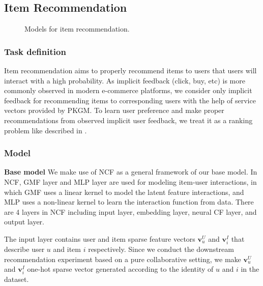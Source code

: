 \subsection{Item Recommendation}
\begin{figure*}[!htbp]
     \centering
    \caption{Models for item recommendation.}
    \label{fig:model-recommendation}
\end{figure*}
\subsubsection{Task definition}
Item recommendation aims to properly recommend items to users that users will interact with a high probability. As implicit feedback (click, buy, etc) is more commonly observed in modern e-commerce platforms, we consider only implicit feedback for recommending items to corresponding users with the help of service vectors provided by PKGM. To learn user preference and make proper recommendations from observed implicit user feedback, we treat it as a ranking problem like described in \cite{DBLP:conf/www/HeLZNHC17}.



\subsubsection{Model}


\textbf{Base model}
We make use of NCF\cite{DBLP:conf/www/HeLZNHC17} as a general framework of our base model. In NCF, GMF layer and MLP layer are used for modeling item-user interactions, in which GMF uses a linear kernel to model the latent feature interactions, and MLP uses a non-linear kernel to learn the interaction function from data. There are 4 layers in NCF including input layer, embedding layer, neural CF layer, and output layer. 

The input layer contains user and item sparse feature vectors $\mathbf{v}_u^U$ and $\mathbf{v}_i^I$ that describe user $u$ and item $i$ respectively. Since we conduct the downstream recommendation experiment based on a pure collaborative setting, we make $\mathbf{v}_u^U$ and $\mathbf{v}_i^I$ one-hot sparse vector generated according to the identity of  $u$ and $i$ in the dataset.

